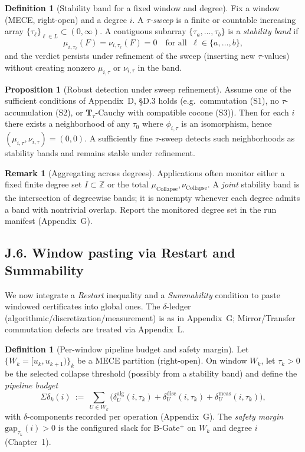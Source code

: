 \documentclass[11pt]{article}
\numberwithin{equation}{section}
\theoremstyle{plain}
\theoremstyle{definition}
\theoremstyle{remark}
\theoremstyle{plain}
\theoremstyle{definition}
\numberwithin{equation}{section}
\newtheorem{proposition}[theorem]{Proposition}
\theoremstyle{definition}
\newtheorem{definition}[theorem]{Definition}
\newtheorem{remark}[theorem]{Remark}
\DeclareRobustCommand{\muc}{\mu_{\mathrm{Collapse}}}
\DeclareRobustCommand{\nuc}{\nu_{\mathrm{Collapse}}}
\numberwithin{equation}{section}
\theoremstyle{plain}
\theoremstyle{definition}
\theoremstyle{remark}
\providecommand{\muc}{\mu_{\mathrm{Collapse}}}
\providecommand{\nuc}{\nu_{\mathrm{Collapse}}}
\begin{document}
\begin{definition}[Stability band for a fixed window and degree]\label{J:def:stab-band}
Fix a window (MECE, right-open) and a degree \(i\).
A \emph{\(\tau\)-sweep} is a finite or countable increasing array \(\{\tau_\ell\}_{\ell\in L}\subset(0,\infty)\).
A contiguous subarray \(\{\tau_a,\ldots,\tau_b\}\) is a \emph{stability band} if
\[
\mu_{i,\tau_\ell}(F)=\nu_{i,\tau_\ell}(F)=0\quad\text{for all }\ \ell\in\{a,\ldots,b\},
\]
and the verdict persists under refinement of the sweep (inserting new \(\tau\)-values) without creating nonzero \(\mu_{i,\tau}\) or \(\nu_{i,\tau}\) in the band.
\end{definition}

\begin{proposition}[Robust detection under sweep refinement]\label{J:prop:robust-band}
Assume one of the sufficient conditions of Appendix~D, §D.3 holds (e.g.\ commutation (S1), no \(\tau\)-accumulation (S2), or \(\mathbf{T}_\tau\)-Cauchy with compatible cocone (S3)). Then for each \(i\) there exists a neighborhood of any \(\tau_0\) where \(\phi_{i,\tau}\) is an isomorphism, hence \((\mu_{i,\tau},\nu_{i,\tau})=(0,0)\). A sufficiently fine \(\tau\)-sweep detects such neighborhoods as stability bands and remains stable under refinement.
\end{proposition}

\begin{remark}[Aggregating across degrees]
Applications often monitor either a fixed finite degree set \(I\subset\mathbb{Z}\) or the total \(\muc,\nuc\). A \emph{joint} stability band is the intersection of degreewise bands; it is nonempty whenever each degree admits a band with nontrivial overlap. Report the monitored degree set in the run manifest (Appendix~G).
\end{remark}

\subsection*{J.6. Window pasting via Restart and Summability}
We now integrate a \emph{Restart} inequality and a \emph{Summability} condition to paste windowed certificates into global ones. The $\delta$-ledger (algorithmic/discretization/measurement) is as in Appendix~G; Mirror/Transfer commutation defects are treated via Appendix~L.

\begin{definition}[Per-window pipeline budget and safety margin]\label{J:def:budget-gap}
Let \(\{W_k=[u_k,u_{k+1})\}_k\) be a MECE partition (right-open).
On window \(W_k\), let \(\tau_k>0\) be the selected collapse threshold (possibly from a stability band) and define the \emph{pipeline budget}
\[
\Sigma\delta_k(i)\ :=\ \sum_{U\in W_k}\Big(\delta^{\mathrm{alg}}_{U}(i,\tau_k)+\delta^{\mathrm{disc}}_{U}(i,\tau_k)+\delta^{\mathrm{meas}}_{U}(i,\tau_k)\Big),
\]
with \(\delta\)-components recorded per operation (Appendix~G). The \emph{safety margin} \(\mathrm{gap}_{\tau_k}(i)>0\) is the configured slack for B-Gate\(^{+}\) on \(W_k\) and degree \(i\) (Chapter~1).
\end{definition}
\end{document}
